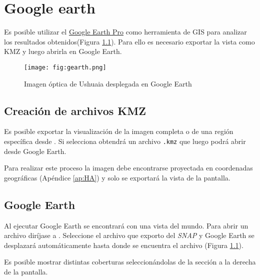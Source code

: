 \chapter{Google earth}\label{ap:GE}

Es posible utilizar el \href{https://www.google.com/earth/desktop/}{Google Earth Pro} como herramienta de GIS para analizar los resultados obtenidos(Figura \ref{fig:gearth}). Para ello es necesario exportar la vista como KMZ y luego abrirla en Google Earth.

\begin{figure}[h!]
    \centering
    \texttt{[image: fig:gearth.png]}
    \caption{Imagen óptica de Ushuaia desplegada en Google Earth}
    \label{fig:gearth}
\end{figure}

\section{Creación de archivos KMZ}

Es posible exportar la visualización de la imagen completa o de una región específica desde . Si selecciona  obtendrá un archivo \texttt{.kmz} que luego podrá abrir desde Google Earth.

Para realizar este proceso la imagen debe encontrarse proyectada en coordenadas geográficas (Apéndice \ref{ap:HA}) y solo se exportará la vista de la pantalla.

\section{Google Earth}

Al ejecutar Google Earth se encontrará con una vista del mundo. Para abrir un archivo  diríjase a . Seleccione el archivo que exporto del \emph{SNAP} y Google Earth se desplazará automáticamente hasta donde se encuentra el archivo (Figura \ref{fig:gearth}).

Es posible mostrar distintas coberturas seleccionándolas de la sección  a la derecha de la pantalla.

